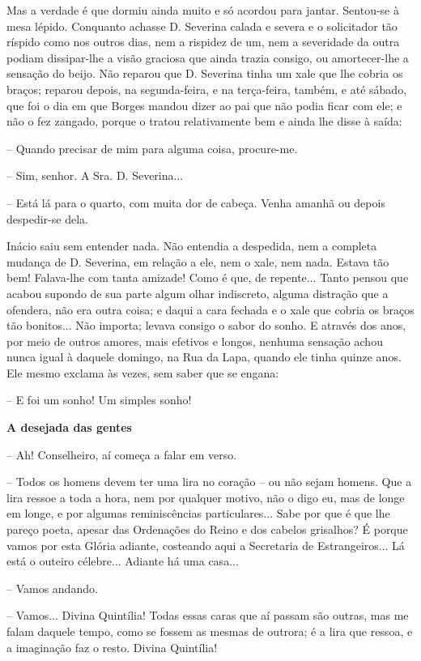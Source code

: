 Mas a verdade é que dormiu ainda muito e só acordou para jantar.
Sentou-se à mesa lépido. Conquanto achasse D. Severina calada e severa e
o solicitador tão ríspido como nos outros dias, nem a rispidez de um,
nem a severidade da outra podiam dissipar-lhe a visão graciosa que ainda
trazia consigo, ou amortecer-lhe a sensação do beijo. Não reparou que D.
Severina tinha um xale que lhe cobria os braços; reparou depois, na
segunda-feira, e na terça-feira, também, e até sábado, que foi o dia em
que Borges mandou dizer ao pai que não podia ficar com ele; e não o fez
zangado, porque o tratou relativamente bem e ainda lhe disse à saída:

-- Quando precisar de mim para alguma coisa, procure-me.

-- Sim, senhor. A Sra. D. Severina...

-- Está lá para o quarto, com muita dor de cabeça. Venha amanhã ou
depois despedir-se dela.

Inácio saiu sem entender nada. Não entendia a despedida, nem a completa
mudança de D. Severina, em relação a ele, nem o xale, nem nada. Estava
tão bem! Falava-lhe com tanta amizade! Como é que, de repente... Tanto
pensou que acabou supondo de sua parte algum olhar indiscreto, alguma
distração que a ofendera, não era outra coisa; e daqui a cara fechada e
o xale que cobria os braços tão bonitos... Não importa; levava consigo o
sabor do sonho. E através dos anos, por meio de outros amores, mais
efetivos e longos, nenhuma sensação achou nunca igual à daquele domingo,
na Rua da Lapa, quando ele tinha quinze anos. Ele mesmo exclama às
vezes, sem saber que se engana:

-- E foi um sonho! Um simples sonho!

\textbf{A desejada das gentes}

-- Ah! Conselheiro, aí começa a falar em verso.

-- Todos os homens devem ter uma lira no coração -- ou não sejam homens.
Que a lira ressoe a toda a hora, nem por qualquer motivo, não o digo eu,
mas de longe em longe, e por algumas reminiscências particulares... Sabe
por que é que lhe pareço poeta, apesar das Ordenações do Reino e dos
cabelos grisalhos? É porque vamos por esta Glória adiante, costeando
aqui a Secretaria de Estrangeiros... Lá está o outeiro célebre...
Adiante há uma casa...

-- Vamos andando.

-- Vamos... Divina Quintília! Todas essas caras que aí passam são
outras, mas me falam daquele tempo, como se fossem as mesmas de outrora;
é a lira que ressoa, e a imaginação faz o resto. Divina Quintília!

